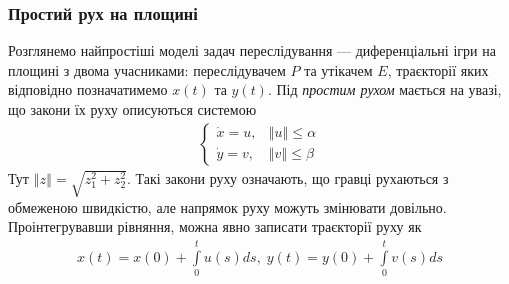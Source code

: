 \documentclass[10pt,pdf,aspectratio=169]{beamer}
\renewcommand{\d}[1]{\dot{#1}}
\newcommand{\norm}[1]{\left\Vert #1 \right\Vert}
\newcommand{\intl}{\int\limits}
\begin{document}
    \begin{frame}
        \frametitle{Простий рух на площині}
    
        Розглянемо найпростіші моделі задач переслідування --- диференціальні ігри на площині з двома учасниками:
        переслідувачем $P$ та утікачем $E$, траєкторії яких відповідно позначатимемо $x(t)$ та $y(t)$.
        Під \emph{простим рухом} мається на увазі, що закони їх руху описуються системою
        \begin{gather*}
            \begin{cases}
                \d{x} = u, & \norm{u} \leq \alpha \\
                \d{y} = v, & \norm{v} \leq \beta 
            \end{cases}
        \end{gather*}
        Тут $\norm{z} = \sqrt{z_1^2 + z_2^2}$.
        Такі закони руху означають, що гравці рухаються з обмеженою швидкістю,
        але напрямок руху можуть змінювати довільно. Проінтегрувавши рівняння, можна явно записати траєкторії руху як
        \begin{gather*}
            x(t) = x(0) + \intl_0^t u(s) ds, \;
            y(t) = y(0) + \intl_0^t v(s) ds
        \end{gather*}
    \end{frame}
\end{document}
